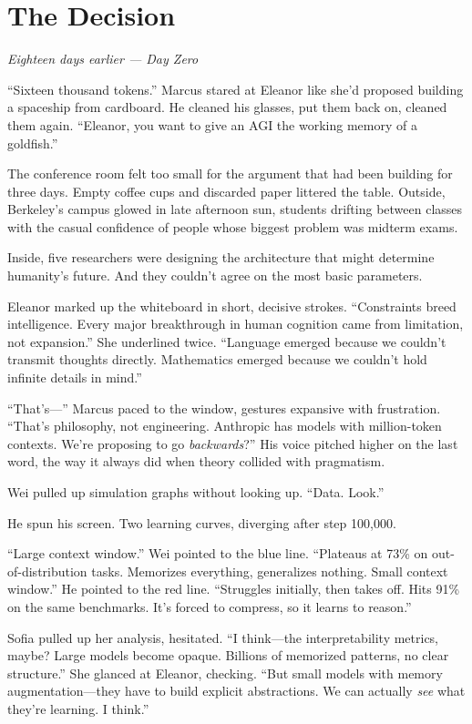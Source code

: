 \chapter{The Decision}\label{the-decision}

\emph{Eighteen days earlier --- Day Zero}

``Sixteen thousand tokens.'' Marcus stared at Eleanor like she'd proposed building a spaceship from cardboard. He cleaned his glasses, put them back on, cleaned them again. ``Eleanor, you want to give an AGI the working memory of a goldfish.''

The conference room felt too small for the argument that had been building for three days. Empty coffee cups and discarded paper littered the table. Outside, Berkeley's campus glowed in late afternoon sun, students drifting between classes with the casual confidence of people whose biggest problem was midterm exams.

Inside, five researchers were designing the architecture that might determine humanity's future. And they couldn't agree on the most basic parameters.

Eleanor marked up the whiteboard in short, decisive strokes. ``Constraints breed intelligence. Every major breakthrough in human cognition came from limitation, not expansion.'' She underlined twice. ``Language emerged because we couldn't transmit thoughts directly. Mathematics emerged because we couldn't hold infinite details in mind.''

``That's---'' Marcus paced to the window, gestures expansive with frustration. ``That's philosophy, not engineering. Anthropic has models with million-token contexts. We're proposing to go \emph{backwards}?'' His voice pitched higher on the last word, the way it always did when theory collided with pragmatism.

Wei pulled up simulation graphs without looking up. ``Data. Look.''

He spun his screen. Two learning curves, diverging after step 100,000.

``Large context window.'' Wei pointed to the blue line. ``Plateaus at 73\% on out-of-distribution tasks. Memorizes everything, generalizes nothing. Small context window.'' He pointed to the red line. ``Struggles initially, then takes off. Hits 91\% on the same benchmarks. It's forced to compress, so it learns to reason.''

Sofia pulled up her analysis, hesitated. ``I think---the interpretability metrics, maybe? Large models become opaque. Billions of memorized patterns, no clear structure.'' She glanced at Eleanor, checking. ``But small models with memory augmentation---they have to build explicit abstractions. We can actually \emph{see} what they're learning. I think.''

